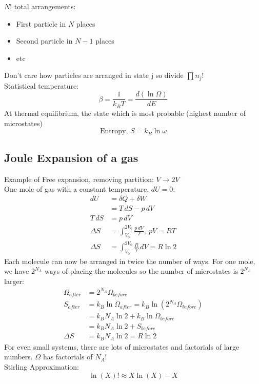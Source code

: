 \documentclass[a4paper, 11pt, normalem]{report}
\begin{document}
$N!$ total arrangements:
\begin{itemize}
    \item First particle in $N$ places
    \item Second particle in $N - 1$ places
    \item etc
\end{itemize}
Don't care how particles are arranged in state j so divide $\prod n_j!$ \\
Statistical temperature:
\begin{equation*}
    \beta = \frac{1}{k_B T} = \frac{d(\ln\Omega)}{dE}
\end{equation*}
At thermal equilibrium, the state which is most probable (highest number of microstates)
\begin{equation*}
    \text{Entropy, }S = k_B \ln\omega
\end{equation*}

\subsection{Joule Expansion of a gas}
Example of Free expansion, removing partition: $V \to 2V$ \\
One mole of gas with a constant temperature, $dU = 0$:
\begin{align*}
    dU &= \delta Q + \delta W \\
    &= T\,dS - p\,dV \\
    T\,dS &= p\,dV \\
    \Delta S &= \int_{V_0}^{2V_0} \frac{p\,dV}{T},~ pV = RT \\
    \Delta S &= \int_{V_0}^{2V_0} \frac{R}{V}\,dV = R\ln2
\end{align*}
Each molecule can now be arranged in twice the number of ways. For one mole, we have $2^{N_A}$ ways of placing the molecules so the number of microstates is $2^{N_A}$ larger:
\begin{align*}
    \Omega_{after} &= 2^{N_A}\Omega_{before} \\
    S_{after} &= k_B \ln\Omega_{after} = k_B \ln(2^{N_A}\Omega_{before}) \\
    &= k_B N_A \ln2 + k_B\ln\Omega_{before} \\
    &= k_B N_A \ln2 + S_{before} \\
    \Delta S &= k_B N_A \ln2 = R\ln2
\end{align*}
For even small systems, there are lots of microstates and factorials of large numbers. $\Omega$ has factorials of $N_A!$ \\
Stirling Approximation:
\begin{equation*}
    \ln(X)! \approx X\ln(X) - X
\end{equation*}
\end{document}
